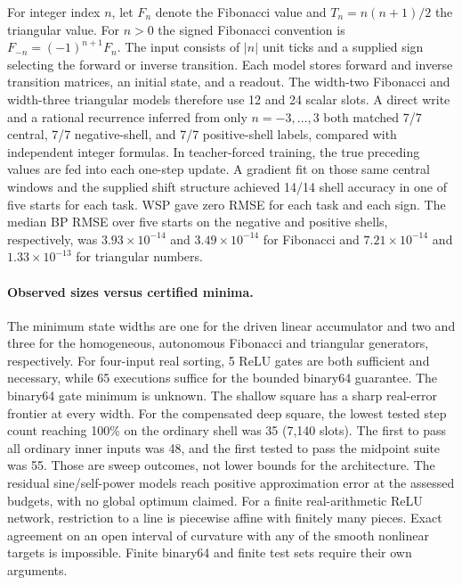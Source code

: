 For integer index \(n\), let \(F_n\) denote the Fibonacci value and \(T_n=n(n+1)/2\) the triangular value. For \(n>0\) the signed Fibonacci convention is \(F_{-n}=(-1)^{n+1}F_n\). The input consists of \(|n|\) unit ticks and a supplied sign selecting the forward or inverse transition. Each model stores forward and inverse transition matrices, an initial state, and a readout. The width-two Fibonacci and width-three triangular models therefore use 12 and 24 scalar slots. A direct write and a rational recurrence inferred from only \(n=-3,\ldots,3\) both matched 7/7 central, 7/7 negative-shell, and 7/7 positive-shell labels, compared with independent integer formulas. In teacher-forced training, the true preceding values are fed into each one-step update. A gradient fit on those same central windows and the supplied shift structure achieved 14/14 shell accuracy in one of five starts for each task. WSP gave zero RMSE for each task and each sign. The median BP RMSE over five starts on the negative and positive shells, respectively, was \(3.93\times10^{-14}\) and \(3.49\times10^{-14}\) for Fibonacci and \(7.21\times10^{-14}\) and \(1.33\times10^{-13}\) for triangular numbers.

\paragraph{Observed sizes versus certified minima.}
The minimum state widths are one for the driven linear accumulator and two and three for the homogeneous, autonomous Fibonacci and triangular generators, respectively. For four-input real sorting, 5 ReLU gates are both sufficient and necessary, while 65 executions suffice for the bounded binary64 guarantee. The binary64 gate minimum is unknown. The shallow square has a sharp real-error frontier at every width. For the compensated deep square, the lowest tested step count reaching 100\% on the ordinary shell was 35 (7,140 slots). The first to pass all ordinary inner inputs was 48, and the first tested to pass the midpoint suite was 55. Those are sweep outcomes, not lower bounds for the architecture. The residual sine/self-power models reach positive approximation error at the assessed budgets, with no global optimum claimed. For a finite real-arithmetic ReLU network, restriction to a line is piecewise affine with finitely many pieces. Exact agreement on an open interval of curvature with any of the smooth nonlinear targets is impossible. Finite binary64 and finite test sets require their own arguments.

